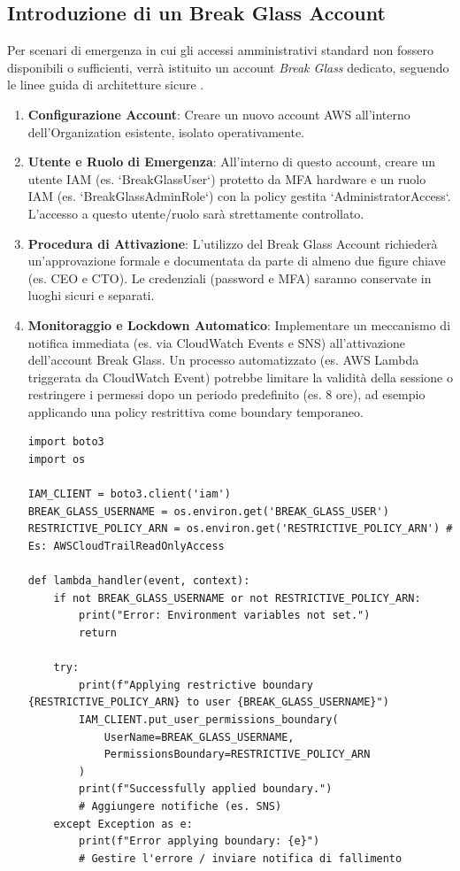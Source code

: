 \documentclass[a4paper,12pt]{report}
\begin{document}
\subsection{Introduzione di un Break Glass Account}

Per scenari di emergenza in cui gli accessi amministrativi standard non fossero disponibili o sufficienti, verrà istituito un account \emph{Break Glass} dedicato, seguendo le linee guida di architetture sicure \cite{saraswat:breakglass}.
\begin{enumerate}
    \item \textbf{Configurazione Account}: Creare un nuovo account AWS all'interno dell'Organization esistente, isolato operativamente.
    \item \textbf{Utente e Ruolo di Emergenza}: All'interno di questo account, creare un utente IAM (es. `BreakGlassUser`) protetto da MFA hardware e un ruolo IAM (es. `BreakGlassAdminRole`) con la policy gestita `AdministratorAccess`. L'accesso a questo utente/ruolo sarà strettamente controllato.
    \item \textbf{Procedura di Attivazione}: L'utilizzo del Break Glass Account richiederà un'approvazione formale e documentata da parte di almeno due figure chiave (es. CEO e CTO). Le credenziali (password e MFA) saranno conservate in luoghi sicuri e separati.
    \item \textbf{Monitoraggio e Lockdown Automatico}: Implementare un meccanismo di notifica immediata (es. via CloudWatch Events e SNS) all'attivazione dell'account Break Glass. Un processo automatizzato (es. AWS Lambda triggerata da CloudWatch Event) potrebbe limitare la validità della sessione o restringere i permessi dopo un periodo predefinito (es. 8 ore), ad esempio applicando una policy restrittiva come boundary temporaneo.
    \begin{lstlisting}[style=python, caption={Esempio Lambda per limitare utente Break Glass (concettuale)}, label=lst:breakglass-lambda]
import boto3
import os

IAM_CLIENT = boto3.client('iam')
BREAK_GLASS_USERNAME = os.environ.get('BREAK_GLASS_USER')
RESTRICTIVE_POLICY_ARN = os.environ.get('RESTRICTIVE_POLICY_ARN') # Es: AWSCloudTrailReadOnlyAccess

def lambda_handler(event, context):
    if not BREAK_GLASS_USERNAME or not RESTRICTIVE_POLICY_ARN:
        print("Error: Environment variables not set.")
        return

    try:
        print(f"Applying restrictive boundary {RESTRICTIVE_POLICY_ARN} to user {BREAK_GLASS_USERNAME}")
        IAM_CLIENT.put_user_permissions_boundary(
            UserName=BREAK_GLASS_USERNAME,
            PermissionsBoundary=RESTRICTIVE_POLICY_ARN
        )
        print(f"Successfully applied boundary.")
        # Aggiungere notifiche (es. SNS)
    except Exception as e:
        print(f"Error applying boundary: {e}")
        # Gestire l'errore / inviare notifica di fallimento
\end{lstlisting}
\end{enumerate}
\end{document}
